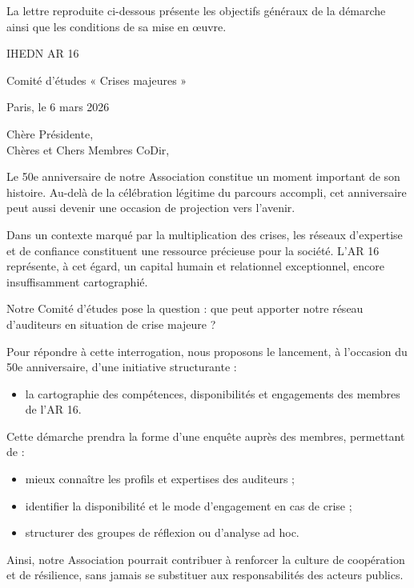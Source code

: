 La lettre reproduite ci-dessous présente les objectifs généraux de la
démarche ainsi que les conditions de sa mise en œuvre.

\begin{tcolorbox}[
breakable,
colback=gray!5,
colframe=black,
boxrule=0.5pt,
arc=3mm
]
\setlength{\parskip}{0.5em}
IHEDN AR 16

Comité d'études « Crises majeures »

\hfill Paris, le 6 mars 2026

Chère Présidente,\\
Chères et Chers Membres CoDir,

Le 50e anniversaire de notre Association constitue un moment important de son histoire. Au-delà de la célébration légitime du parcours accompli, cet anniversaire peut aussi devenir une occasion de projection vers l'avenir.

Dans un contexte marqué par la multiplication des crises, les réseaux d'expertise et de confiance constituent une ressource précieuse pour la société. L'AR 16 représente, à cet égard, un capital humain et relationnel exceptionnel, encore insuffisamment cartographié.

Notre Comité d'études pose la question : que peut apporter notre réseau d'auditeurs en situation de crise majeure ?

Pour répondre à cette interrogation, nous proposons le lancement, à l'occasion du 50e anniversaire, d'une initiative structurante :

\begin{itemize}
    \item la cartographie des compétences, disponibilités et engagements des membres de l'AR 16.
\end{itemize}

Cette démarche prendra la forme d'une enquête auprès des membres, permettant de :

\begin{itemize}
    \item mieux connaître les profils et expertises des auditeurs ;
    \item identifier la disponibilité et le mode d'engagement en cas de crise ;
    \item structurer des groupes de réflexion ou d'analyse ad hoc.
\end{itemize}

Ainsi, notre Association pourrait contribuer à renforcer la culture de coopération et de résilience, sans jamais se substituer aux responsabilités des acteurs publics.


\end{tcolorbox}

